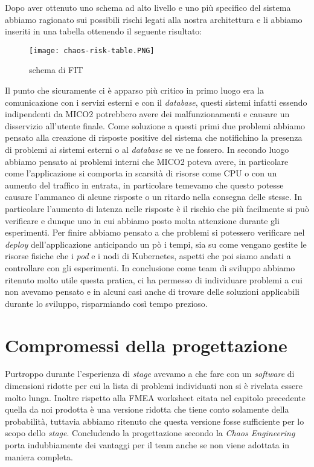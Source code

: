 Dopo aver ottenuto uno schema ad alto livello e uno più specifico del sistema abbiamo ragionato sui possibili rischi legati alla nostra architettura e li abbiamo inseriti in una tabella ottenendo il seguente risultato:
\begin{figure}[H]
    \centering
    \texttt{[image: chaos-risk-table.PNG]}
    \caption{schema di FIT}
    \label{tab:fitschema}
\end{figure}
Il punto che sicuramente ci è apparso più critico in primo luogo era la comunicazione con i servizi esterni e con il \textit{database}, questi sistemi infatti essendo indipendenti da MICO2 potrebbero avere dei malfunzionamenti e causare un disservizio all'utente finale.
Come soluzione a questi primi due problemi abbiamo pensato alla creazione di risposte positive del sistema che notifichino la presenza di problemi ai sistemi esterni o al \textit{database} se ve ne fossero.
In secondo luogo abbiamo pensato ai problemi interni che MICO2 poteva avere, in particolare come l'applicazione si comporta in scarsità di risorse come CPU o con un aumento del traffico in entrata, in particolare temevamo che questo potesse causare l'ammanco di alcune risposte o un ritardo nella consegna delle stesse.
In particolare l'aumento di latenza nelle risposte è il rischio che più facilmente si può verificare e dunque uno in cui abbiamo posto molta attenzione durante gli esperimenti.
Per finire abbiamo pensato a che problemi si potessero verificare nel \textit{deploy} dell'applicazione anticipando un pò i tempi, sia su come vengano gestite le risorse fisiche che i \textit{pod} e i nodi di Kubernetes, aspetti che poi siamo andati a controllare con gli esperimenti.
In conclusione come team di sviluppo abbiamo ritenuto molto utile questa pratica, ci ha permesso di individuare problemi a cui non avevamo pensato e in alcuni casi anche di trovare delle soluzioni applicabili durante lo sviluppo, risparmiando così tempo prezioso.

\section{Compromessi della progettazione}
Purtroppo durante l'esperienza di \textit{stage} avevamo a che fare con un \textit{software} di dimensioni ridotte per cui la lista di problemi individuati non si è rivelata essere molto lunga.
Inoltre rispetto alla FMEA worksheet citata nel capitolo precedente quella da noi prodotta è una versione ridotta che tiene conto solamente della probabilità, tuttavia abbiamo ritenuto che questa versione fosse sufficiente per lo scopo dello \textit{stage}.
Concludendo la progettazione secondo la \textit{Chaos Engineering} porta indubbiamente dei vantaggi per il team anche se non viene adottata in maniera completa.

